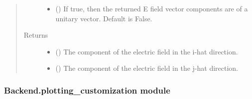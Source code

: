 \documentclass[letterpaper,10pt,english]{sphinxmanual}
\begin{document}
\begin{fulllineitems}
\begin{quote}
\begin{description}
\begin{itemize}
\item {} 
 () \textendash{} If true, then the returned E field vector components are of a unitary
vector. Default is False.

\end{itemize}

\item[{Returns}] \leavevmode
\begin{itemize}
\item {} 
 () \textendash{} The component of the electric field in the i-hat direction.

\item {} 
 () \textendash{} The component of the electric field in the j-hat direction.

\end{itemize}


\end{description}\end{quote}

\end{fulllineitems}



\subsubsection{Backend.plotting\_customization module}
\label{\detokenize{Backend.plotting_customization:module-Backend.plotting_customization}}\label{\detokenize{Backend.plotting_customization:backend-plotting-customization-module}}\label{\detokenize{Backend.plotting_customization::doc}}
\end{document}
